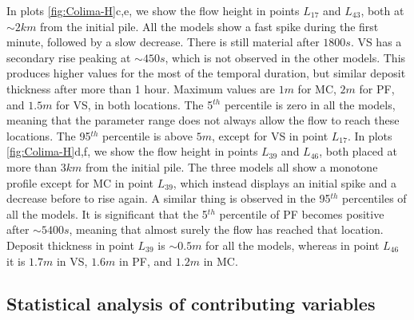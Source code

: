 \documentclass{article}
\begin{document}
In plots \ref{fig:Colima-H}c,e, we show the flow height in points $L_{17}$ and $L_{43}$, both at $\sim 2 km$ from the initial pile. All the models show a fast spike during the first minute, followed by a slow decrease. There is still material after $1800 s$. VS has a secondary rise peaking at $\sim 450 s$, which is not observed in the other models. This produces higher values for the most of the temporal duration, but similar deposit thickness after more than 1 hour. Maximum values are $1 m$ for MC, $2 m$ for PF, and $1.5 m$ for VS, in both locations. The 5$^{th}$ percentile is zero in all the models, meaning that the parameter range does not always allow the flow to reach these locations. The 95$^{th}$ percentile is above $5 m$, except for VS in point $L_{17}$. In plots \ref{fig:Colima-H}d,f, we show the flow height in points $L_{39}$ and $L_{46}$, both placed at more than $3 km$ from the initial pile. The three models all show a monotone profile except for  MC in point $L_{39}$, which instead displays an initial spike and a decrease before to rise again. A similar thing is observed in the 95$^{th}$ percentiles of all the models. It is significant that the 5$^{th}$ percentile of PF becomes positive after $\sim 5400 s$, meaning that almost surely the flow has reached that location. Deposit thickness in point $L_{39}$ is $\sim 0.5 m$ for all the models, whereas in point $L_{46}$ it is $1.7 m$ in VS, $1.6 m$ in PF, and $1.2 m$ in MC.
\newpage
\subsection{Statistical analysis of contributing variables}\label{Hq2}
\end{document}
